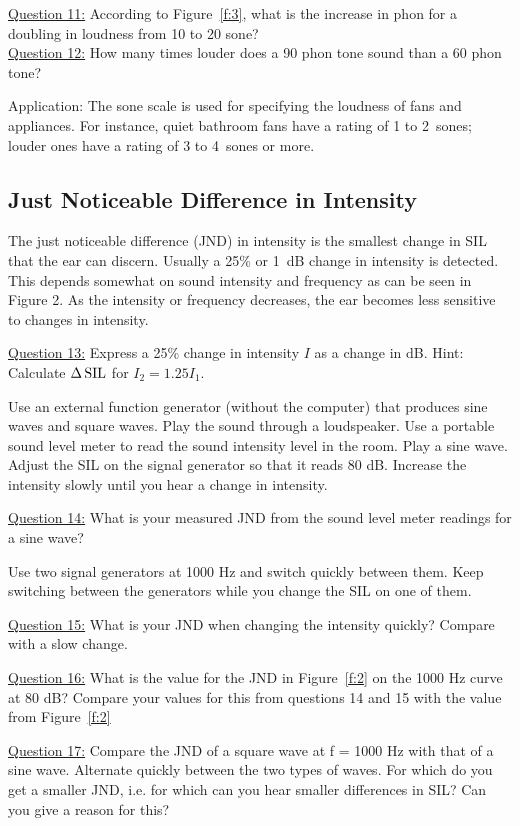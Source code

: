 \documentclass[11pt]{NSF}
\begin{document}
\underline{Question 11:} According to Figure~\ref{f:3}, what is the increase in phon for a doubling in loudness from 10 to 20
sone? \\

\underline{Question 12:} How many times louder does a 90 phon tone sound than a 60 phon tone? 


Application:
The sone scale is used for specifying the loudness of fans and
appliances. For instance, quiet bathroom fans have a rating of 1 to 
2~sones; louder ones have a rating of 3 to 4~sones or more.

\subsection{Just Noticeable Difference in Intensity}

The just noticeable difference (JND) in intensity is the smallest
change in SIL that the ear can discern. Usually a 25\% or 1~dB change in
intensity is detected. This depends somewhat on sound intensity and
frequency as can be seen in Figure 2. As the intensity or frequency
decreases, the ear becomes less sensitive to changes in intensity.

\underline{Question 13:} Express a 25\% change in intensity $I$ as a change in dB. 
Hint: Calculate $\Delta\,{\rm SIL}$ for $I_2 = 1.25 I_1$.

Use an external function generator (without the computer) that produces sine waves and square
waves. Play the sound through a loudspeaker. Use a portable sound level meter to read the sound
intensity level in the room. Play a sine wave. Adjust the SIL on the signal generator so that it
reads 80 dB. Increase the intensity slowly until you hear a change in intensity.

\underline{Question 14:} What is your measured JND from the sound level meter readings for a sine wave? 

Use two signal generators at 1000 Hz and switch quickly between them. Keep switching between
the generators while you change the SIL on one of them.

\underline{Question 15:} What is your JND when changing the intensity quickly? Compare with a slow change.

\underline{Question 16:} What is the value for the JND in Figure~\ref{f:2} on the 1000 Hz curve at 80 dB? 
Compare your values for this from questions 14
and 15 with the value from Figure~\ref{f:2}

\underline{Question 17:} Compare the JND of a square wave at f = 1000 Hz with that of a sine wave. Alternate
quickly between the two types of waves. For which do you get a smaller JND, i.e. for which can
you hear smaller differences in SIL? Can you give a reason for this? 
\end{document}
